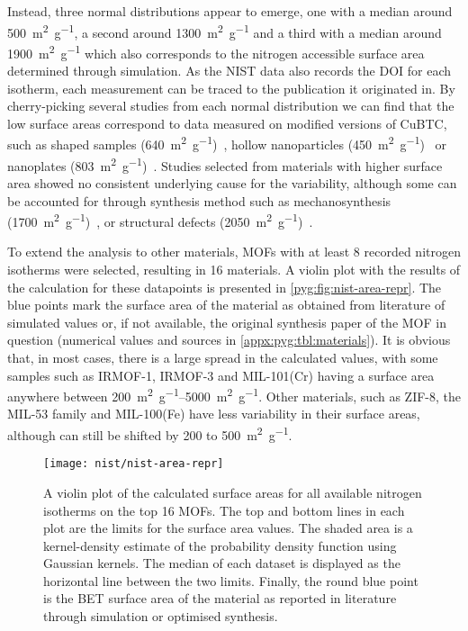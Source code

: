 Instead, three normal distributions appear to emerge, one with a
median around \SI{500}{\metre^2\per\gram}, a second around \SI{1300}{\metre^2\per\gram}
and a third with a median around \SI{1900}{\metre^2\per\gram} which also
corresponds to the nitrogen accessible surface area determined through
simulation. As the NIST data also records the DOI for each isotherm, each
measurement can be traced to the publication it originated in.
By cherry-picking several studies from each normal distribution
we can find that the low surface areas correspond to data
measured on modified versions of CuBTC, such as shaped
samples (\SI{640}{\metre^2\per\gram})~\cite{liSeparationCO2CH42014}, hollow
nanoparticles (\SI{450}{\metre^2\per\gram})~\cite{liControllableSynthesisMetal2013}
or nanoplates
(\SI{803}{\metre^2\per\gram})~\cite{pengSurfactantdirectedAssemblyMesoporous2012}.
Studies selected from materials with higher surface area
showed no consistent underlying cause for the variability,
although some can be accounted for through synthesis method
such as mechanosynthesis
(\SI{1700}{\metre^2\per\gram})~\cite{klimakowMechanochemicalSynthesisMetal2010},
or structural defects (\SI{2050}{\metre^2\per\gram})~\cite{barinDefectCreationLinker2014}.

To extend the analysis to other materials, MOFs with
at least 8 recorded nitrogen isotherms were selected, resulting in
16 materials. A violin plot with the results of the calculation for
these datapoints is presented in \autoref{pyg:fig:nist-area-repr}.
The blue points mark the surface area of the material as
obtained from literature of simulated values or, if not available,
the original synthesis paper of the MOF in question
(numerical values and sources in \autoref{appx:pyg:tbl:materials}).
It is obvious that, in most cases, there is a large spread in
the calculated values, with some samples such as IRMOF-1,
IRMOF-3 and MIL-101(Cr) having a surface area anywhere
between \SIrange{200}{5000}{\metre^2\per\gram}. Other materials,
such as ZIF-8, the MIL-53 family
and MIL-100(Fe) have less variability in their surface areas,
although can still be shifted by 200 to \SI{500}{\metre^2\per\gram}.

\begin{figure}[tb]
	\centering
	\texttt{[image: nist/nist-area-repr]}%
	\caption{A violin plot of the calculated surface areas for
		all available nitrogen isotherms on the top 16 MOFs.
		The top and bottom lines in each plot are the limits for
		the surface area values. The shaded area is a kernel-density estimate
		of the probability density function using Gaussian kernels.
		The median of each dataset is displayed as the horizontal line
		between the two limits. Finally, the round blue point is the
		BET surface area of the material as reported in literature through
		simulation or optimised synthesis.
	}\label{pyg:fig:nist-area-repr}
\end{figure}

